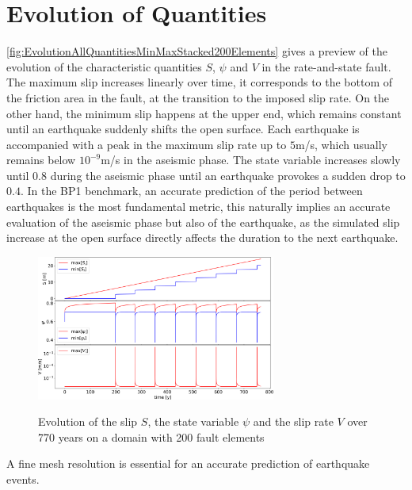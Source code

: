 \section{Evolution of Quantities}
\autoref{fig:EvolutionAllQuantitiesMinMaxStacked200Elements} gives a preview of the evolution of the characteristic quantities $S$, $\psi$ and $V$ in the rate-and-state fault. The maximum slip increases linearly over time, it corresponds to the bottom of the friction area in the fault, at the transition to the imposed slip rate. On the other hand, the minimum slip happens at the upper end, which remains constant until an earthquake suddenly shifts the open surface. Each earthquake is accompanied with a peak in the maximum slip rate up to $5$m/s, which usually remains below $10^{-9}$m/s in the aseismic phase. The state variable increases slowly until $0.8$ during the aseismic phase until an earthquake provokes a sudden drop to $0.4$. In the BP1 benchmark, an accurate prediction of the period between earthquakes is the most fundamental metric, this naturally implies an accurate evaluation of the aseismic phase but also of the earthquake, as the simulated slip increase at the open surface directly affects the duration to the next earthquake.

\begin{figure}[H]
	\centering
	\includegraphics[width=0.7\textwidth]{images/TANDEMtimeEvolution_MinMaxAllStacked_Size200_RKDP5_extendedODE}
	\label{fig:EvolutionAllQuantitiesMinMaxStacked200Elements}
	\caption{Evolution of the slip $S$, the state variable $\psi$ and the slip rate $V$ over 770 years on a domain with 200 fault elements}
\end{figure}

A fine mesh resolution is essential for an accurate prediction of earthquake events. 
